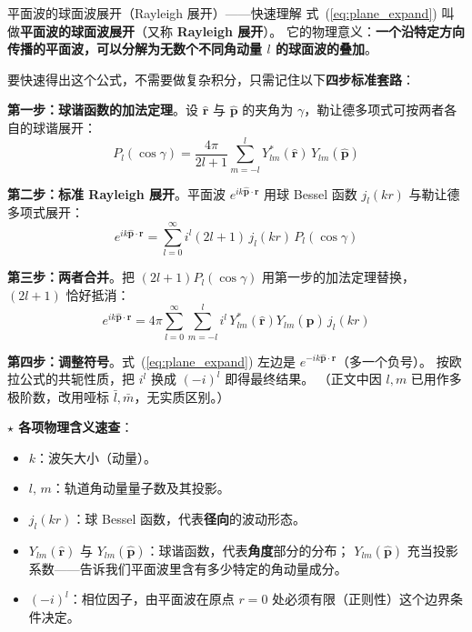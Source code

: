 \begin{stepbox}{平面波的球面波展开（Rayleigh 展开）——快速理解}
式~(\ref{eq:plane_expand}) 叫做\textbf{平面波的球面波展开}（又称 \textbf{Rayleigh 展开}）。
它的物理意义：\textbf{一个沿特定方向传播的平面波，可以分解为无数个不同角动量 $l$ 的球面波的叠加}。

要快速得出这个公式，不需要做复杂积分，只需记住以下\textbf{四步标准套路}：

\smallskip
\textbf{第一步：球谐函数的加法定理}。设 $\hat{\mathbf{r}}$ 与 $\hat{\mathbf{p}}$ 的夹角为 $\gamma$，勒让德多项式可按两者各自的球谐展开：
\begin{equation}
  P_l(\cos\gamma) = \frac{4\pi}{2l+1}\sum_{m=-l}^{l}
    Y_{lm}^*(\hat{\mathbf{r}})\,Y_{lm}(\hat{\mathbf{p}})
\end{equation}

\textbf{第二步：标准 Rayleigh 展开}。平面波 $e^{ik\hat{\mathbf{p}}\cdot\mathbf{r}}$ 用球 Bessel 函数 $j_l(kr)$ 与勒让德多项式展开：
\begin{equation}
  e^{ik\hat{\mathbf{p}}\cdot\mathbf{r}} = \sum_{l=0}^{\infty} i^l(2l+1)\,j_l(kr)\,P_l(\cos\gamma)
\end{equation}

\textbf{第三步：两者合并}。把 $(2l+1)P_l(\cos\gamma)$ 用第一步的加法定理替换，$(2l+1)$ 恰好抵消：
\begin{equation}
  e^{ik\hat{\mathbf{p}}\cdot\mathbf{r}} = 4\pi\sum_{l=0}^{\infty}\sum_{m=-l}^{l}
    i^l\,Y_{lm}^*(\hat{\mathbf{r}})Y_{lm}(\hat{\mathbf{p}})\,j_l(kr)
\end{equation}

\textbf{第四步：调整符号}。式~(\ref{eq:plane_expand}) 左边是 $e^{-ik\hat{\mathbf{p}}\cdot\mathbf{r}}$（多一个负号）。
按欧拉公式的共轭性质，把 $i^l$ 换成 $(-i)^l$ 即得最终结果。
（正文中因 $l,m$ 已用作多极阶数，改用哑标 $\bar{l},\bar{m}$，无实质区别。）

\smallskip
\textbf{$\star$ 各项物理含义速查}：
\begin{itemize}
  \item $k$：波矢大小（动量）。
  \item $l,\,m$：轨道角动量量子数及其投影。
  \item $j_l(kr)$：球 Bessel 函数，代表\textbf{径向}的波动形态。
  \item $Y_{lm}(\hat{\mathbf{r}})$ 与 $Y_{lm}(\hat{\mathbf{p}})$：球谐函数，代表\textbf{角度}部分的分布；
    $Y_{lm}(\hat{\mathbf{p}})$ 充当投影系数——告诉我们平面波里含有多少特定的角动量成分。
  \item $(-i)^l$：相位因子，由平面波在原点 $r=0$ 处必须有限（正则性）这个边界条件决定。
\end{itemize}
\end{stepbox}

